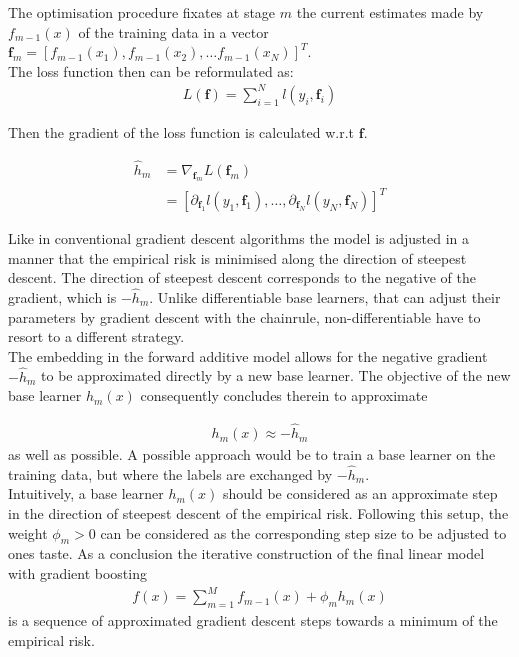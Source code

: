 \documentclass[a4paper, 11pt]{article}
\begin{document}
The optimisation procedure fixates at stage $m$ the current estimates made by $f_{m-1}(x)$ of the training data in a vector $\mathbf{f}_m = [f_{m-1}(x_1), f_{m-1}(x_2), \ldots f_{m-1}(x_N)]^T$. \\

The loss function then can be reformulated as:
\begin{align*}
L(\mathbf{f}) = \sum_{i = 1}^{N}l(y_i, \mathbf{f}_i)
\end{align*}

Then the gradient of the loss function is calculated w.r.t $\mathbf{f}$.

\begin{align*}
\hat{h}_m &= \nabla_{\mathbf{f}_m}L(\mathbf{f}_m) \\
&=[\partial_{\mathbf{f}_1} l(y_1, \mathbf{f}_1),\ldots, \partial_{\mathbf{f}_N} l(y_N, \mathbf{f}_N)]^T
\end{align*}

Like in conventional gradient descent algorithms the model is adjusted in a manner that the empirical risk is minimised along the direction of steepest descent. The direction of steepest descent corresponds to the negative of the gradient, which is $- \hat{h}_m$. Unlike differentiable base learners, that can adjust their parameters by gradient descent with the chainrule, non-differentiable have to resort to a different strategy.\\
The embedding in the forward additive model allows for the negative gradient $-\hat{h}_m$ to be approximated directly by a new base learner. The objective of the new base learner $h_m(x)$ consequently concludes therein to approximate

\begin{align*}
h_m(x) \approx -\hat{h}_m
\end{align*}
as well as possible. A possible approach would be to train a base learner on the training data, but where the labels are exchanged by $-\hat{h}_m$.\\
Intuitively, a base learner $h_m(x)$ should be considered as an approximate step in the direction of steepest descent of the empirical risk. Following this setup, the weight $\phi_m > 0$ can be considered as the corresponding step size to be adjusted to ones taste. As a conclusion the iterative construction of the final linear model with gradient boosting
\begin{align*}
f(x) = \sum_{m=1}^{M}f_{m-1}(x) + \phi_m h_m(x)
\end{align*}
is a sequence of approximated gradient descent steps towards a minimum of the empirical risk. 
\end{document}
